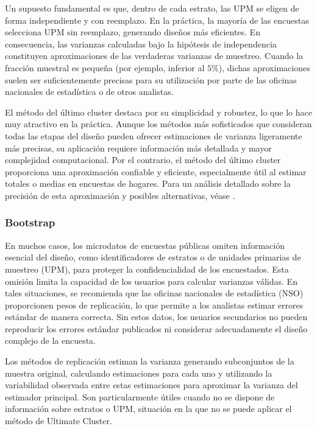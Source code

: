 \documentclass[
  spanish,
  12pt,
]{book}
\begin{document}
Un supuesto fundamental es que, dentro de cada estrato, las UPM se eligen de forma independiente y con reemplazo. En la práctica, la mayoría de las encuestas selecciona UPM sin reemplazo, generando diseños más eficientes. En consecuencia, las varianzas calculadas bajo la hipótesis de independencia constituyen aproximaciones de las verdaderas varianzas de muestreo. Cuando la fracción muestral es pequeña (por ejemplo, inferior al \(5\%\)), dichas aproximaciones suelen ser suficientemente precisas para su utilización por parte de las oficinas nacionales de estadística o de otros analistas.

El método del último cluster destaca por su simplicidad y robustez, lo que lo hace muy atractivo en la práctica. Aunque los métodos más sofisticados que consideran todas las etapas del diseño pueden ofrecer estimaciones de varianza ligeramente más precisas, su aplicación requiere información más detallada y mayor complejidad computacional. Por el contrario, el método del último cluster proporciona una aproximación confiable y eficiente, especialmente útil al estimar totales o medias en encuestas de hogares. Para un análisis detallado sobre la precisión de esta aproximación y posibles alternativas, véase \citet{sarndal2003model}.

\subsubsection*{Bootstrap}\label{bootstrap}

En muchos casos, los microdatos de encuestas públicas omiten información esencial del diseño, como identificadores de estratos o de unidades primarias de muestreo (UPM), para proteger la confidencialidad de los encuestados. Esta omisión limita la capacidad de los usuarios para calcular varianzas válidas. En tales situaciones, se recomienda que las oficinas nacionales de estadística (NSO) proporcionen pesos de replicación, lo que permite a los analistas estimar errores estándar de manera correcta. Sin estos datos, los usuarios secundarios no pueden reproducir los errores estándar publicados ni considerar adecuadamente el diseño complejo de la encuesta.

Los métodos de replicación estiman la varianza generando subconjuntos de la muestra original, calculando estimaciones para cada uno y utilizando la variabilidad observada entre estas estimaciones para aproximar la varianza del estimador principal. Son particularmente útiles cuando no se dispone de información sobre estratos o UPM, situación en la que no se puede aplicar el método de Ultimate Cluster.
\end{document}
